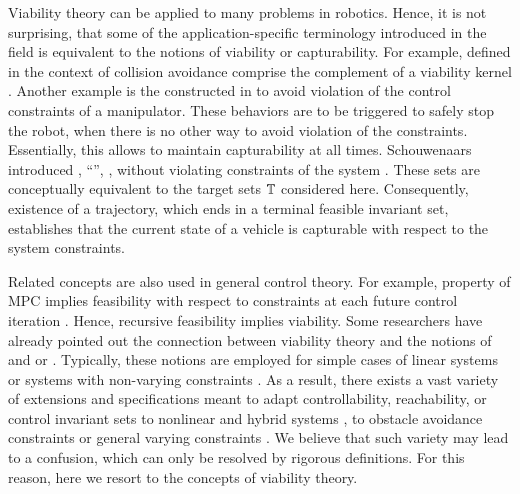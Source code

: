 Viability theory can be applied to many problems in robotics. Hence, it is not
surprising, that some of the application-specific terminology introduced in the
field is equivalent to the notions of viability or capturability. For example,
 defined in the context of collision avoidance
comprise the complement of a viability kernel \cite{Fraichard2003iros}. Another
example is the  constructed in
\cite{Rubrecht2012auro} to avoid violation of the control constraints of a
manipulator. These behaviors are to be triggered to safely stop the robot, when
there is no other way to avoid violation of the constraints. Essentially, this
allows to maintain capturability at all times. Schouwenaars introduced
, ``'', \IE, without violating constraints of the system
\cite[Chapter~4]{Schouwenaars2006thesis}. These sets are conceptually equivalent
to the target sets $\mathbb{T}$ considered here. Consequently, existence of a
trajectory, which ends in a terminal feasible invariant set, establishes that
the current state of a vehicle is capturable with respect to the system
constraints.


Related concepts are also used in general control theory. For example,
 property of \ac{MPC} implies feasibility with
respect to constraints at each future control iteration
\cite[Chapter~8]{Rossiter2003mpc}. Hence, recursive feasibility implies
viability. Some researchers have already pointed out the connection between
viability theory and the notions of  and 
\cite{Zaytsev2015icra, Wieber2015handbook} or 
\cite{Wieber2002stability}. Typically, these notions are employed for simple
cases of linear systems or systems with non-varying constraints
\cite{Sontag1998control, Blanchini2008sets, Borrelli2015mpc,
Kerrigan2000thesis}. As a result, there exists a vast variety of extensions and
specifications meant to adapt controllability, reachability, or control
invariant sets to nonlinear and hybrid systems \cite{Sontag1998control,
Tomlin2003procieee, Bemporad2000tranac, Lewis1999siamr}, to obstacle avoidance
constraints \cite[Chapter~15]{LaValle2006planning} or general varying
constraints \cite[Chapter~2]{Rawlings2009mpc}. We believe that such variety may
lead to a confusion, which can only be resolved by rigorous definitions. For
this reason, here we resort to the concepts of viability theory.



